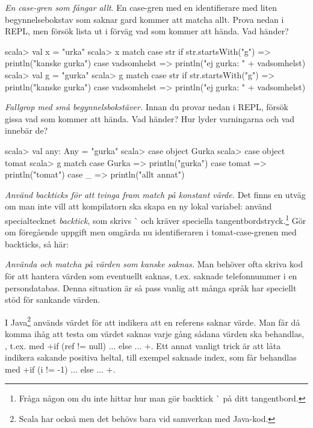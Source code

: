 \Subtask \emph{En case-gren som fångar allt}. En case-gren med en identifierare med liten begynnelsebokstav som saknar gard kommer att matcha allt. Prova nedan i REPL, men försök lista ut i förväg vad som kommer att hända. Vad händer?
\begin{REPL}
scala> val x = "urka"
scala> x match {
         case str if str.startsWith("g") => println("kanske gurka")
         case vadsomhelst => println("ej gurka: " + vadsomhelst) 
       }
scala> val g = "gurka"
scala> g match {
         case str if str.startsWith("g") => println("kanske gurka")
         case vadsomhelst => println("ej gurka: " + vadsomhelst) 
       }
\end{REPL}

\Subtask \emph{Fallgrop med små begynnelsbokstäver.} Innan du provar nedan i REPL, försök gissa vad som kommer att hända. Vad händer? Hur lyder varningarna och vad innebär de?
\begin{REPL}       
scala> val any: Any = "gurka"
scala> case object Gurka
scala> case object tomat
scala> g match {
         case Gurka => println("gurka") 
         case tomat => println("tomat")
         case _ => println("allt annat")
       }
\end{REPL}

\Subtask \emph{Använd backticks för att tvinga fram match på konstant värde.} Det finns en utväg om man inte vill att kompilatorn ska skapa en ny lokal variabel: använd specialtecknet \emph{backtick}, som skrivs \`{} och kräver speciella tangentbordstryck.\footnote{Fråga någon om du inte hittar hur man gör backtick \`{} på ditt tangentbord.}  Gör om föregående uppgift men omgärda nu identifieraren  i tomat-case-grenen med backticks, så här: 



\Task \emph{Använda  och matcha på värden som kanske saknas.} Man behöver ofta skriva kod för att hantera värden som eventuellt saknas, t.ex. saknade telefonnummer i en persondatabas. Denna situation är så pass vanlig att många språk har speciellt stöd för sankande värden. 

I Java\footnote{Scala har också  men det behövs bara vid samverkan med Java-kod.} används värdet  för att indikera att en referens saknar värde. Man får då komma ihåg att testa om värdet saknas varje gång sådana värden ska behandlas, , t.ex. med  \code+if (ref != null) { ...} else { ... }+. Ett annat vanligt trick är att låta  indikera sakande positiva heltal, till exempel saknade index, som får behandlas med \code+if (i != -1) { ...} else { ... }+. 

